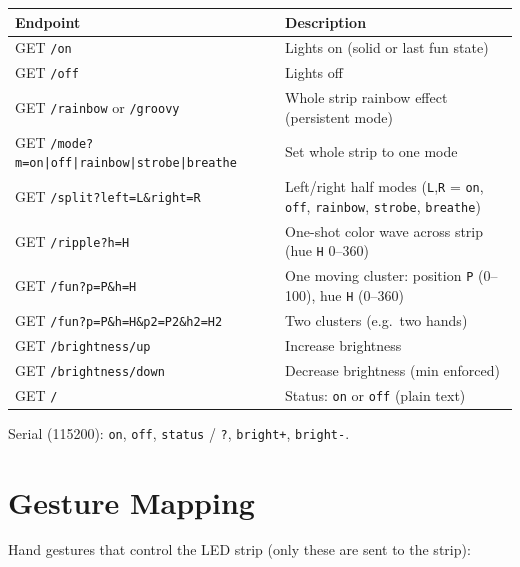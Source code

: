 \documentclass[a4paper,12pt]{article}
\begin{document}
\begin{center}
\begin{tabular}{@{}ll@{}}
\toprule
\textbf{Endpoint} & \textbf{Description} \\ \midrule
GET \texttt{/on}  & Lights on (solid or last fun state) \\
GET \texttt{/off} & Lights off \\
GET \texttt{/rainbow} or \texttt{/groovy} & Whole strip rainbow effect (persistent mode) \\
GET \texttt{/mode?m=on|off|rainbow|strobe|breathe} & Set whole strip to one mode \\
GET \texttt{/split?left=L\&right=R} & Left/right half modes (\texttt{L},\texttt{R} = \texttt{on}, \texttt{off}, \texttt{rainbow}, \texttt{strobe}, \texttt{breathe}) \\
GET \texttt{/ripple?h=H} & One-shot color wave across strip (hue \texttt{H} 0--360) \\
GET \texttt{/fun?p=P\&h=H} & One moving cluster: position \texttt{P} (0--100), hue \texttt{H} (0--360) \\
GET \texttt{/fun?p=P\&h=H\&p2=P2\&h2=H2} & Two clusters (e.g.\ two hands) \\
GET \texttt{/brightness/up}   & Increase brightness \\
GET \texttt{/brightness/down} & Decrease brightness (min enforced) \\
GET \texttt{/} & Status: \texttt{on} or \texttt{off} (plain text) \\ \bottomrule
\end{tabular}
\end{center}

Serial (115200): \texttt{on}, \texttt{off}, \texttt{status} / \texttt{?}, \texttt{bright+}, \texttt{bright-}.

\section{Gesture Mapping}

Hand gestures that control the LED strip (only these are sent to the strip):
\end{document}
